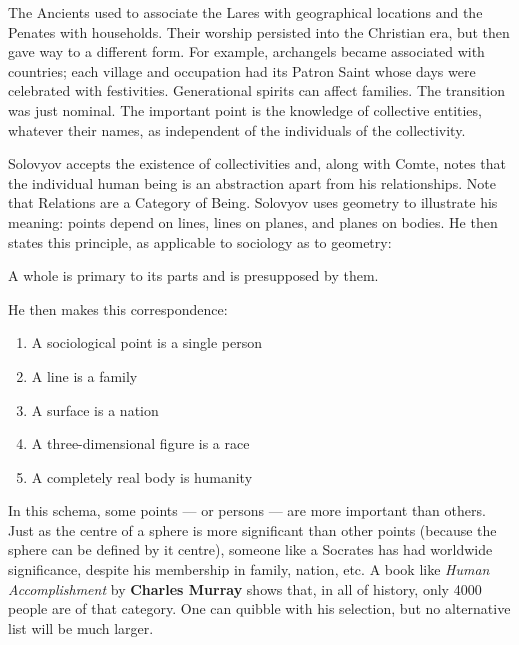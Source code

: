 The Ancients used to associate the Lares with geographical locations and the Penates with households. Their worship persisted into the Christian era, but then gave way to a different form. For example, archangels became associated with countries; each village and occupation had its Patron Saint whose days were celebrated with festivities. Generational spirits can affect families. The transition was just nominal. The important point is the knowledge of collective entities, whatever their names, as independent of the individuals of the collectivity.

Solovyov accepts the existence of collectivities and, along with Comte, notes that the individual human being is an abstraction apart from his relationships. Note that Relations are a Category of Being. Solovyov uses geometry to illustrate his meaning: points depend on lines, lines on planes, and planes on bodies. He then states this principle, as applicable to sociology as to geometry:

\begin{quotex}
A whole is primary to its parts and is presupposed by them.
\end{quotex}


He then makes this correspondence:

\begin{enumerate}


\item A sociological point is a single person

\item A line is a family

\item A surface is a nation

\item A three-dimensional figure is a race

\item A completely real body is humanity
\end{enumerate}


In this schema, some points --- or persons --- are more important than others. Just as the centre of a sphere is more significant than other points (because the sphere can be defined by it centre), someone like a Socrates has had worldwide significance, despite his membership in family, nation, etc. A book like \emph{Human Accomplishment} by \textbf{Charles Murray} shows that, in all of history, only 4000 people are of that category. One can quibble with his selection, but no alternative list will be much larger.

